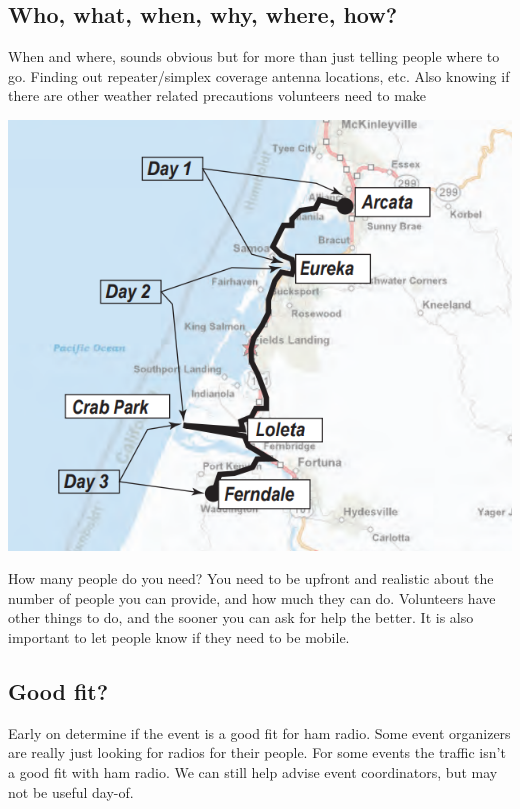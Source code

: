 \documentclass[11pt]{beamer}
\begin{document}
\subsection{Who, what, when, why, where, how?}
\begin{frame}
	When and where, sounds obvious but for more than just telling people where to go. Finding out repeater/simplex coverage antenna locations, etc. Also knowing if there are other weather related precautions volunteers need to make
\end{frame}

\begin{frame}
	\begin{center}
	\includegraphics[height=.8\textheight]{media/Annotation-2019-09-14-084812.png}
	\end{center}
\end{frame}

\begin{frame}
	How many people do you need? You need to be upfront and realistic about the number of people you can provide, and how much they can do. Volunteers have other things to do, and the sooner you can ask for help the better. It is also important to let people know if they need to be mobile.
\end{frame}

\subsection{Good fit?}
\begin{frame}
	Early on determine if the event is a good fit for ham radio. Some event organizers are really just looking for radios for their people. For some events the traffic isn't a good fit with ham radio. We can still help advise event coordinators, but may not be useful day-of.
\end{frame}
\end{document}
